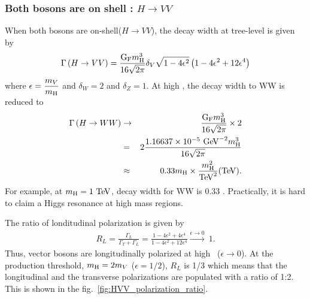 %
\subsubsection{Both bosons are on shell : $H \rightarrow VV$}
When both bosons are on-shell($ H \rightarrow VV$), 
the decay width at tree-level is given by~\cite{PhysRevD.49.79}
\begin{eqnarray} 
\Gamma \left( H \rightarrow VV \right) 
= 
\frac{\mathrm{G_{\mathrm{F}}} m_{\mathrm{H}}^3}{16\sqrt{2\pi}} \delta_V \sqrt{1-4\epsilon^2} 
\left( 1 - 4\epsilon^2 + 12\epsilon^4 \right)
\end{eqnarray} 
where $\displaystyle \epsilon = \frac{m_V}{m_{\mathrm{H}}}$ and $\delta_W=2$ and $\delta_Z=1$.
At high \mHi, the decay width to WW is reduced to 
\begin{eqnarray} 
\Gamma \left( H \rightarrow WW \right)
&\rightarrow&
\frac{\mathrm{G_{\mathrm{F}}} m_{\mathrm{H}}^3}{16\sqrt{2\pi}} \times 2 \\
&=&  
2 \frac{ 1.16637 \times 10^{-5}~\mathrm{Ge\kern -0.1em V}^{-2} m_{\mathrm{H}}^3}{16\sqrt{2\pi}} \\
&\approx&
0.33 m_{\mathrm{H}} \times \frac{m_{\mathrm{H}}^2}{\mathrm{Te\kern -0.1em V}^2} (\mathrm{Te\kern -0.1em V}).   
\end{eqnarray} 
For example, at $m_{\mathrm{H}}=1~\mathrm{Te\kern -0.1em V}$, decay width for WW is 0.33 \TeV.
Practically, it is hard to claim a Higgs resonance at high mass regions.  

The ratio of londitudinal polarization is given by \cite{PhysRevD.49.79}
\begin{eqnarray} 
R_L 
= 
\frac{\Gamma_L}{\Gamma_T + \Gamma_L}    
= 
\frac{1 - 4\epsilon^2 + 4\epsilon^4}{1 - 4\epsilon^2 + 12\epsilon^4} 
\xrightarrow{\epsilon \rightarrow 0}\ 1.
\end{eqnarray} 
Thus, vector bosons are longitudinally polarized at high \mHi\ ($\epsilon \rightarrow 0$). 
At the production threshold, $\displaystyle m_{\mathrm{H}} = 2m_V$ ($\epsilon = 1/2$), 
$R_L$ is 1/3 which means that the longitudinal and the transverse polarizations are populated 
with a ratio of 1:2. This is shown in the fig.~\ref{fig:HVV_polarization_ratio}.

%

